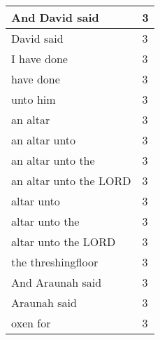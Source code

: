 \begin{center}
\begin{longtable}{|p{3.0in}|p{0.5in}|}
And David said & 3\\ \hline 
David said & 3\\ \hline 
I have done & 3\\ \hline 
have done & 3\\ \hline 
unto him & 3\\ \hline 
an altar & 3\\ \hline 
an altar unto & 3\\ \hline 
an altar unto the & 3\\ \hline 
an altar unto the LORD & 3\\ \hline 
altar unto & 3\\ \hline 
altar unto the & 3\\ \hline 
altar unto the LORD & 3\\ \hline 
the threshingfloor & 3\\ \hline 
And Araunah said & 3\\ \hline 
Araunah said & 3\\ \hline 
oxen for & 3\\ \hline 
\end{longtable}
\end{center}





